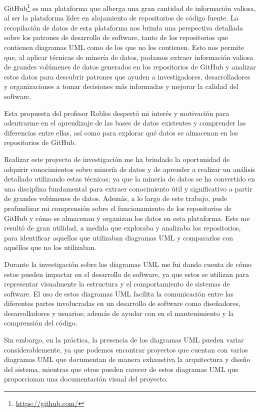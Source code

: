 \documentclass[a4paper, 12pt]{book}
\begin{document}
GitHub\footnote{\url{https://github.com/}} es una plataforma que alberga una gran cantidad de información valiosa, al ser la plataforma líder en alojamiento de repositorios de código fuente. 
La recopilación de datos de esta plataforma nos brinda una perspectiva detallada sobre los patrones de desarrollo de software, tanto de los repositorios que contienen diagramas UML como de los que no los contienen.
Esto nos permite que, al aplicar técnicas de minería de datos, podamos extraer información valiosa de grandes volúmenes de datos generados en los repositorios de GitHub y analizar estos datos para descubrir patrones que ayuden a investigadores, desarrolladores y organizaciones a tomar decisiones más informadas y mejorar la calidad del software.


Esta propuesta del profesor Robles despertó mi interés y motivación para adentrarme en el aprendizaje de las bases de datos existentes y comprender las diferencias entre ellas, así como para explorar qué datos se almacenan en los repositorios de GitHub.


Realizar este proyecto de investigación me ha brindado la oportunidad de adquirir conocimientos sobre minería de datos y de aprender a realizar un análisis detallado utilizando estas técnicas; ya que la minería de datos se ha convertido en una disciplina fundamental para extraer conocimiento útil y significativo a partir de grandes volúmenes de datos.
Además, a lo largo de este trabajo, pude profundizar mi comprensión sobre el funcionamiento de los repositorios de GitHub y cómo se almacenan y organizan los datos en esta plataforma. 
Este me resultó de gran utilidad, a medida que exploraba y analizaba los repositorios, para identificar aquellos que utilizaban diagramas UML y compararlos con aquéllos que no los utilizaban.


Durante la investigación sobre los diagramas UML me fui dando cuenta de cómo estos pueden impactar en el desarrollo de software, ya que estos se utilizan para representar visualmente la estructura y el comportamiento de sistemas de software.
El uso de estos diagramas UML facilita la comunicación entre las diferentes partes involucradas en un desarrollo de software como diseñadores, desarrolladores y usuarios; además de ayudar con en el mantenimiento y la comprensión del código.


Sin embargo, en la práctica, la presencia de los diagramas UML pueden variar considerablemente, ya que podemos encontrar proyectos que cuentan con varios diagramas UML que documentan de manera exhaustiva la arquitectura y diseño del sistema, mientras que otros pueden carecer de estos diagramas UML que proporcionan una documentación visual del proyecto.
\end{document}
